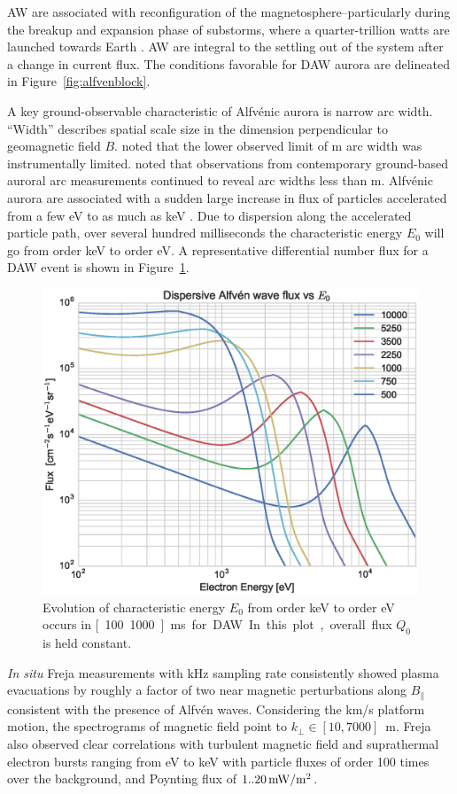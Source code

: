 AW are associated with reconfiguration of the magnetosphere--particularly during the breakup and expansion phase of substorms, where a quarter-trillion watts are launched towards Earth \citep{mottez2015}.
AW are integral to the settling out of the system after a change in current flux.
The conditions favorable for DAW aurora are delineated in Figure~\ref{fig:alfvenblock}.

A key ground-observable characteristic of Alfvénic aurora is narrow arc width.
``Width'' describes spatial scale size in the dimension perpendicular to geomagnetic field $B$.
\citet{maggsdavis1968} noted that the lower observed limit of \unit[70]{m} arc width was instrumentally limited.
\citet{borovsky1993} noted that observations from contemporary ground-based auroral arc measurements continued to reveal arc widths less than \unit[100]{m}.
Alfvénic aurora are associated with a sudden large increase in flux of particles accelerated from a few eV to as much as \unit[10]{keV} \citep{chaston2003}.
Due to dispersion along the accelerated particle path, over several hundred milliseconds \citep{dahlgren2013} the characteristic energy $E_0$ will go from order \unit[10]{keV} to order \unit[100]{eV}.
A representative differential number flux for a DAW event is shown in Figure~\ref{fig:alfvenflux}.
\begin{figure}
    \includegraphics[width=0.9\columnwidth]{gfx/eflux}
    \caption{Evolution of characteristic energy $E_0$ from order \unit[10]{keV} to order \unit[100]{eV} occurs in \unit[100..1000]{ms} for DAW.
    In this plot, overall flux $Q_0$ is held constant.}
    \label{fig:alfvenflux}
\end{figure}
\textit{In situ} Freja measurements with \unit[32]{kHz} sampling rate \citep{stasiewicz2000} consistently showed plasma evacuations by roughly a factor of two near magnetic perturbations along $B_\parallel$ consistent with the presence of Alfvén waves.
Considering the \unit[7]{km/s} platform motion, the spectrograms of magnetic field point to $k_\perp \in [10,7000]$~m.
Freja also observed clear correlations \citep{stasiewicz2000} with turbulent magnetic field and suprathermal electron bursts ranging from \unit[100]{eV} to \unit[20]{keV} with particle fluxes of order 100 times over the background, and Poynting flux of $\unit[1..20]{mW/m^2}$.

